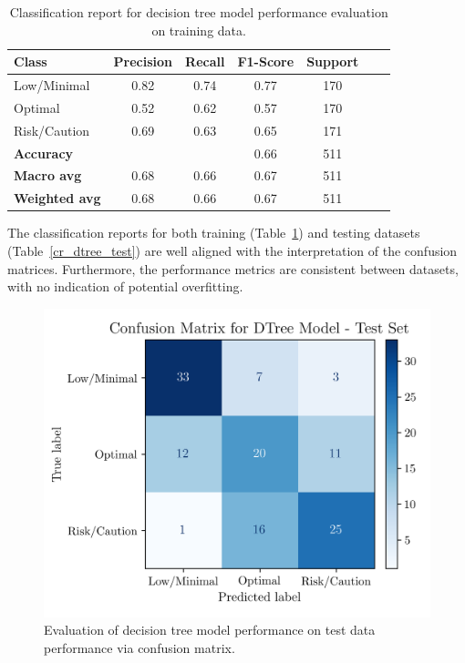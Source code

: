 \documentclass[conference]{IEEEtran}
\begin{document}
\begin{table}[H]
\centering
\caption{Classification report for decision tree model performance evaluation on training data.}
\label{cr_dtree_train}
\begin{tabular}{lcccccc}
\toprule
\textbf{Class} & \textbf{Precision} & \textbf{Recall} & \textbf{F1-Score} & \textbf{Support} \\
\midrule
Low/Minimal & 0.82 & 0.74 & 0.77 & 170 \\
Optimal & 0.52 & 0.62 & 0.57 & 170 \\
Risk/Caution & 0.69 & 0.63 & 0.65 & 171 \\
\midrule
\textbf{Accuracy} &  &  & 0.66 & 511 \\
\textbf{Macro avg} & 0.68 & 0.66 & 0.67 & 511 \\
\textbf{Weighted avg} & 0.68 & 0.66 & 0.67 & 511 \\
\bottomrule
\end{tabular}
\end{table} %

The classification reports for both training (Table~\ref{cr_dtree_train}) and testing datasets (Table~\ref{cr_dtree_test}) are well aligned with the interpretation of the confusion matrices. Furthermore, the performance metrics are consistent between datasets, with no indication of potential overfitting.

\begin{figure}[H]
    \centering
    \includegraphics[width=.995\linewidth]{assets/DTREE_ConfusionMatrixTest.png}
    \caption{Evaluation of decision tree model performance on test data performance via confusion matrix.}
    \label{dtree_cmtest}
\end{figure} %
\end{document}
